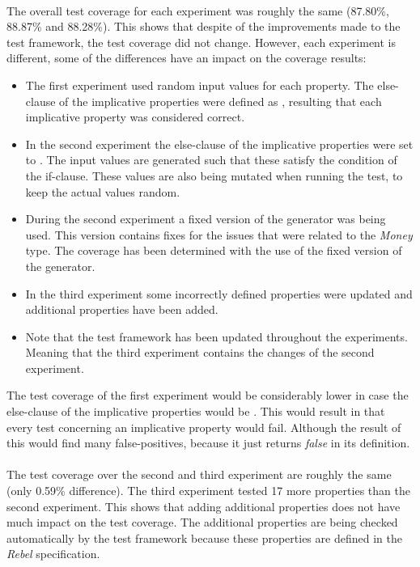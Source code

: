 \\
The overall test coverage for each experiment was roughly the same (87.80\%, 88.87\% and 88.28\%). This shows that despite of the improvements made to the test framework, the test coverage did not change. However, each experiment is different, some of the differences have an impact on the coverage results:
\begin{itemize}
  \item The first experiment used random input values for each property. The else-clause of the implicative properties were defined as , resulting that each implicative property was considered correct.
  \item In the second experiment the else-clause of the implicative properties were set to . The input values are generated such that these satisfy the condition of the if-clause. These values are also being mutated when running the test, to keep the actual values random.
  \item During the second experiment a fixed version of the generator was being used. This version contains fixes for the issues that were related to the \textit{Money} type. The coverage has been determined with the use of the fixed version of the generator.
  \item In the third experiment some incorrectly defined properties were updated and additional properties have been added.
  \item Note that the test framework has been updated throughout the experiments. Meaning that the third experiment contains the changes of the second experiment.
\end{itemize}
The test coverage of the first experiment would be considerably lower in case the else-clause of the implicative properties would be . This would result in that every test concerning an implicative property would fail. Although the result of this would find many false-positives, because it just returns \textit{false} in its definition.\\
\\
The test coverage over the second and third experiment are roughly the same (only 0.59\% difference). The third experiment tested 17 more properties than the second experiment. This shows that adding additional properties does not have much impact on the test coverage. The additional properties are being checked automatically by the test framework because these properties are defined in the \textit{Rebel} specification.

